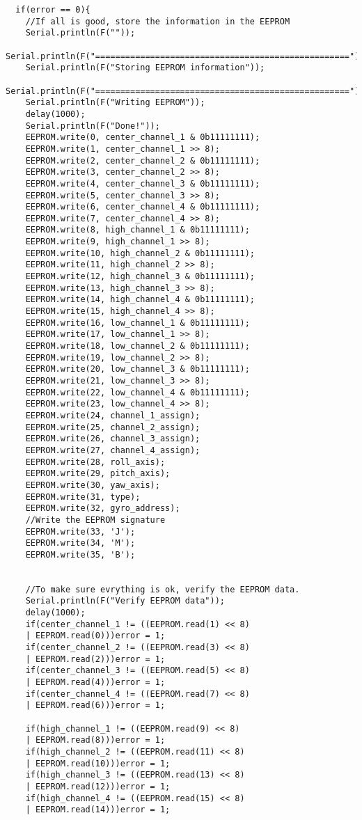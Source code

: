 \begin{lstlisting}
  if(error == 0){
    //If all is good, store the information in the EEPROM
    Serial.println(F(""));
    Serial.println(F("==================================================="));
    Serial.println(F("Storing EEPROM information"));
    Serial.println(F("==================================================="));
    Serial.println(F("Writing EEPROM"));
    delay(1000);
    Serial.println(F("Done!"));
    EEPROM.write(0, center_channel_1 & 0b11111111);
    EEPROM.write(1, center_channel_1 >> 8);
    EEPROM.write(2, center_channel_2 & 0b11111111);
    EEPROM.write(3, center_channel_2 >> 8);
    EEPROM.write(4, center_channel_3 & 0b11111111);
    EEPROM.write(5, center_channel_3 >> 8);
    EEPROM.write(6, center_channel_4 & 0b11111111);
    EEPROM.write(7, center_channel_4 >> 8);
    EEPROM.write(8, high_channel_1 & 0b11111111);
    EEPROM.write(9, high_channel_1 >> 8);
    EEPROM.write(10, high_channel_2 & 0b11111111);
    EEPROM.write(11, high_channel_2 >> 8);
    EEPROM.write(12, high_channel_3 & 0b11111111);
    EEPROM.write(13, high_channel_3 >> 8);
    EEPROM.write(14, high_channel_4 & 0b11111111);
    EEPROM.write(15, high_channel_4 >> 8);
    EEPROM.write(16, low_channel_1 & 0b11111111);
    EEPROM.write(17, low_channel_1 >> 8);
    EEPROM.write(18, low_channel_2 & 0b11111111);
    EEPROM.write(19, low_channel_2 >> 8);
    EEPROM.write(20, low_channel_3 & 0b11111111);
    EEPROM.write(21, low_channel_3 >> 8);
    EEPROM.write(22, low_channel_4 & 0b11111111);
    EEPROM.write(23, low_channel_4 >> 8);
    EEPROM.write(24, channel_1_assign);
    EEPROM.write(25, channel_2_assign);
    EEPROM.write(26, channel_3_assign);
    EEPROM.write(27, channel_4_assign);
    EEPROM.write(28, roll_axis);
    EEPROM.write(29, pitch_axis);
    EEPROM.write(30, yaw_axis);
    EEPROM.write(31, type);
    EEPROM.write(32, gyro_address);
    //Write the EEPROM signature
    EEPROM.write(33, 'J'); 
    EEPROM.write(34, 'M');
    EEPROM.write(35, 'B');
        
    
    //To make sure evrything is ok, verify the EEPROM data.
    Serial.println(F("Verify EEPROM data"));
    delay(1000);
    if(center_channel_1 != ((EEPROM.read(1) << 8) 
    | EEPROM.read(0)))error = 1;
    if(center_channel_2 != ((EEPROM.read(3) << 8) 
    | EEPROM.read(2)))error = 1;
    if(center_channel_3 != ((EEPROM.read(5) << 8) 
    | EEPROM.read(4)))error = 1;
    if(center_channel_4 != ((EEPROM.read(7) << 8) 
    | EEPROM.read(6)))error = 1;
    
    if(high_channel_1 != ((EEPROM.read(9) << 8) 
    | EEPROM.read(8)))error = 1;
    if(high_channel_2 != ((EEPROM.read(11) << 8) 
    | EEPROM.read(10)))error = 1;
    if(high_channel_3 != ((EEPROM.read(13) << 8) 
    | EEPROM.read(12)))error = 1;
    if(high_channel_4 != ((EEPROM.read(15) << 8) 
    | EEPROM.read(14)))error = 1;
    

\end{lstlisting}

